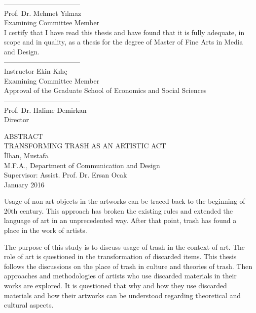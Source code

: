 \documentclass[12pt]{report}
\begin{document}
\noindent---------------------------------\\
Prof. Dr. Mehmet Yılmaz\\
Examining Committee Member\\

\noindent I certify that I have read this thesis and have found that it is fully adequate, in scope and in quality, as a thesis for the degree of Master of Fine Arts in Media and Design.\\

\noindent---------------------------------\\
Instructor Ekin Kılıç\\
Examining Committee Member\\

\noindent Approval of the Graduate School of Economics and Social Sciences\\

\noindent---------------------------------\\
Prof. Dr. Halime Demirkan\\
Director\\

\clearpage


\thispagestyle{plain}
{}
\doublespacing
\begin{center}
	\vspace*{7mm}
	\MakeUppercase{Abstract}\\
    \vspace{\baselineskip}
    TRANSFORMING TRASH AS AN ARTISTIC ACT\\
    İlhan, Mustafa\\
    M.F.A., Department of Communication and Design\\
    Supervisor: Assist. Prof. Dr. Ersan Ocak\\
    \vspace{\baselineskip}
    January 2016
\end{center}
\singlespacing
\par Usage of non-art objects in the artworks can be traced back to the beginning of 20th century. This approach has broken the existing rules and extended the language of art in an unprecedented way. After that point, trash has found a place in the work of artists.

The purpose of this study is to discuss usage of trash in the context of art. The role of art is questioned in the transformation of discarded items. This thesis follows the discussions on the place of trash in culture and theories of trash. Then approaches and methodologies of artists who use discarded materials in their works are explored. It is questioned that why and how they use discarded materials and how their artworks can be understood regarding theoretical and cultural aspects.
\end{document}
